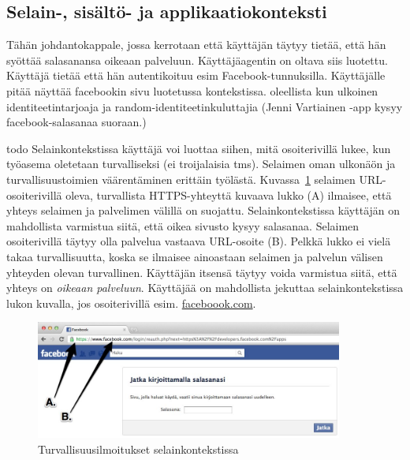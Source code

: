 \documentclass[finnish,gradu]{tktltiki}
\begin{document}



  \subsection{Selain-, sisältö- ja applikaatiokonteksti} %
  \label{sub:selainkonteksti_vs_applikaatiokonteksti}

  Tähän johdantokappale, jossa kerrotaan että käyttäjän täytyy tietää, että hän syöttää salasanansa oikeaan palveluun. Käyttäjäagentin on oltava siis luotettu. Käyttäjä tietää että hän autentikoituu esim Facebook-tunnuksilla. Käyttäjälle pitää näyttää facebookin sivu luotetussa kontekstissa. oleellista kun ulkoinen identiteetintarjoaja ja random-identiteetinkuluttajia (Jenni Vartiainen -app kysyy facebook-salasanaa suoraan.)

  todo
  Selainkontekstissa käyttäjä voi luottaa siihen, mitä osoiterivillä lukee, kun työasema oletetaan turvalliseksi (ei troijalaisia tms). Selaimen oman ulkonäön ja turvallisuustoimien väärentäminen erittäin työlästä. Kuvassa~\ref{fig:facebook_reauth_ab} selaimen URL-osoiterivillä oleva, turvallista HTTPS-yhteyttä kuvaava lukko (A) ilmaisee, että yhteys selaimen ja palvelimen välillä on suojattu. Selainkontekstissa käyttäjän on mahdollista varmistua siitä, että oikea sivusto kysyy salasanaa. Selaimen osoiterivillä täytyy olla palvelua vastaava URL-osoite (B). Pelkkä lukko ei vielä takaa turvallisuutta, koska se ilmaisee ainoastaan selaimen ja palvelun välisen yhteyden olevan turvallinen. Käyttäjän itsensä täytyy voida varmistua siitä, että yhteys on \emph{oikeaan palveluun}. Käyttäjää on mahdollista jekuttaa selainkontekstissa lukon kuvalla, jos osoiterivillä esim. \url{faceboook.com}.

  \begin{figure}
    \centering
    \includegraphics[width=0.9\textwidth]{images/Facebook_reauth_ab.jpg}
    \caption{Turvallisuusilmoitukset selainkontekstissa}
    \label{fig:facebook_reauth_ab}
  \end{figure}
\end{document}
